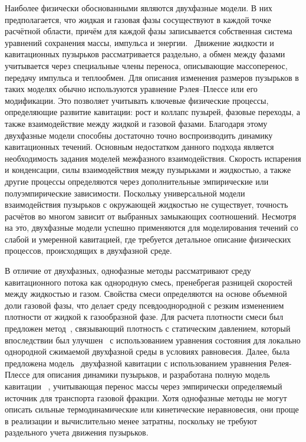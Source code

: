 Наиболее физически обоснованными являются двухфазные модели. В них предполагается, что жидкая и газовая фазы сосуществуют в каждой точке расчётной области, причём для каждой фазы записывается собственная система уравнений сохранения массы, импульса и энергии.~\cite{10.1017/s0022112000003098, 10.1143/jpsj.75.104401} Движение жидкости и кавитационных пузырьков рассматривается раздельно, а обмен между фазами учитывается через специальные члены переноса, описывающие массоперенос, передачу импульса и теплообмен.
Для описания изменения размеров пузырьков в таких моделях обычно используются уравнение Рэлея–Плессе или его модификации. Это позволяет учитывать ключевые физические процессы, определяющие развитие кавитации: рост и коллапс пузырей, фазовые переходы, а также взаимодействие между жидкой и газовой фазами. Благодаря этому двухфазные модели способны достаточно точно воспроизводить динамику кавитационных течений.
Основным недостатком данного подхода является необходимость задания моделей межфазного взаимодействия. Скорость испарения и конденсации, силы взаимодействия между пузырьками и жидкостью, а также другие процессы определяются через дополнительные эмпирические или полуэмпирические зависимости. Поскольку универсальной модели взаимодействия пузырьков с окружающей жидкостью не существует, точность расчётов во многом зависит от выбранных замыкающих соотношений. Несмотря на это, двухфазные модели успешно применяются для моделирования течений со слабой и умеренной кавитацией, где требуется детальное описание физических процессов, происходящих в двухфазной среде.~\cite{10.1002/fld.833, 10.1016/s1001-6058(08)60117-1}


В отличие от двухфазных, однофазные методы рассматривают среду кавитационного потока как однородную смесь, пренебрегая разницей скоростей между жидкостью и газом. Свойства смеси определяются на основе объемной доли газовой фазы, что делает среду псевдооднородной с резким изменением плотности от жидкой к газообразной фазе. Для расчета плотности смеси был предложен метод~\cite{delannoy1990two}, связывающий плотность с статическим давлением, который впоследствии был улучшен~\cite{10.1115/1.1596239} с использованием уравнения состояния для локально однородной сжимаемой двухфазной среды в условиях равновесия. Далее, была предложена модель~\cite{10.1017/s002211209200003x} двухфазной кавитации с использованием уравнения Релея-Плессе для описания динамики пузырьков, и разработана полную модель кавитации ~\cite{10.1115/1.1486223}, учитывающая перенос массы через эмпирически определяемый источник для транспорта газовой фракции. Хотя однофазные методы не могут описать сильные термодинамические или кинетические неравновесия, они проще в реализации и вычислительно менее затратны, поскольку не требуют раздельного учета движения пузырьков.  

